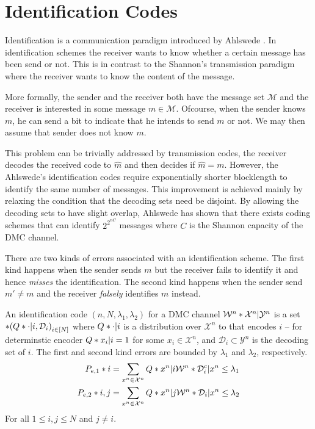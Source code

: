 \section{Identification Codes}
Identification is a communication paradigm introduced by Ahlswede \cite{idfeedback}. In identification schemes the receiver wants to know whether a certain message has been send or not. This is in contrast to the Shannon's transmission paradigm where the receiver wants to know the content of the message. 

More formally, the sender and the receiver both have the message set \(\mathcal{M}\) and the receiver is interested in some message \(m \in \mathcal{M}\). Ofcourse, when the sender knows \(m\), he can send a bit to indicate that he intends to send \(m\) or not. We may then assume that sender does not know \(m\). 

This problem can be trivially addressed by transmission codes, the receiver decodes the received code to \(\hat{m}\) and then decides if \(\hat{m} = m\). However, the  Ahlswede's identification codes require exponentially shorter blocklength to identify the same number of messages. This improvement is achieved mainly by relaxing the condition that the decoding sets need be disjoint. By allowing the decoding sets to have slight overlap, Ahlswede \cite{idfeedback} has shown that there exists coding schemes that can identify \(2^{2^{nC}}\) messages where \(C\) is the Shannon capacity of the DMC channel.

There are two kinds of errors associated with an identification scheme. The first kind happens when the sender sends \(m\) but the receiver fails to identify it and hence \textit{misses} the identification. The second kind happens when the sender send \(m' \neq m\) and the receiver \textit{falsely} identifies \(m\) instead.

\begin{definition}\label{def:idcode}
	An identification code \((n, N,\lambda_1, \lambda_2)\) for a DMC channel \(\func{\mathcal{W}^n}{\mathcal{X}^n | \mathcal{Y}^n}\) is a set \(\set{ (\func{Q}{ \cdot |i} ,\mathcal{D}_i)}_{i \in [N]}\) where \(\func{Q}{ \cdot |i}\) is a distribution over \(\mathcal{X}^n\) to that encodes \(i\) -- for determinstic encoder \(\func{Q}{ x_i |i} = 1\) for some \(x_i \in \mathcal{X}^n\), and \(\mathcal{D}_i \subset \mathcal{Y}^n\) is the decoding set of \(i\). The first and second kind errors are bounded by \(\lambda_1\) and \(\lambda_2\), respectively.
	\begin{align*}
		\func{P_{e,1}}{i} &= \sum_{x^n \in \mathcal{X}^n} \func{Q}{ x^n |i} \func{\mathcal{W}^n}{\mathcal{D}_i^c | x^n} \leq \lambda_1 \\
		\func{P_{e,2}}{i,j}&=\sum_{x^n \in \mathcal{X}^n} \func{Q}{ x^n |j} \func{\mathcal{W}^n}{\mathcal{D}_i | x^n} \leq \lambda_2
	\end{align*}
	For all \(1 \leq i,j \leq N\) and \(j \neq i\).
\end{definition}

